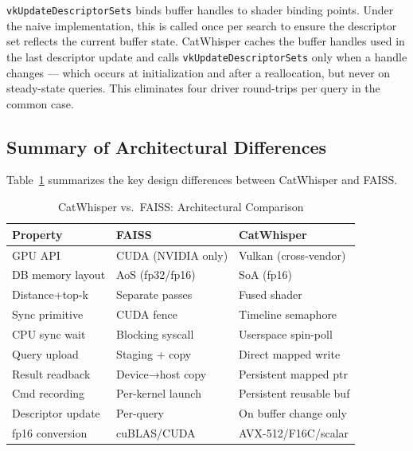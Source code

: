 \documentclass[conference]{IEEEtran}
\begin{document}
\texttt{vkUpdateDescriptorSets} binds buffer handles to shader binding
points.  Under the naive implementation, this is called once per search to
ensure the descriptor set reflects the current buffer state.  CatWhisper
caches the buffer handles used in the last descriptor update and calls
\texttt{vkUpdateDescriptorSets} only when a handle changes --- which occurs
at initialization and after a reallocation, but never on steady-state queries.
This eliminates four driver round-trips per query in the common case.

\subsection{Summary of Architectural Differences}

Table~\ref{tab:arch} summarizes the key design differences between
CatWhisper and FAISS.

\begin{table}[htbp]
  \caption{CatWhisper vs.\ FAISS: Architectural Comparison}
  \label{tab:arch}
  \centering
  \renewcommand{\arraystretch}{1.15}
  \begin{tabular}{lll}
    \toprule
    \textbf{Property} & \textbf{FAISS} & \textbf{CatWhisper} \\
    \midrule
    GPU API           & CUDA (NVIDIA only) & Vulkan (cross-vendor) \\
    DB memory layout  & AoS (fp32/fp16)    & SoA (fp16) \\
    Distance+top-k    & Separate passes    & Fused shader \\
    Sync primitive    & CUDA fence         & Timeline semaphore \\
    CPU sync wait     & Blocking syscall   & Userspace spin-poll \\
    Query upload      & Staging + copy     & Direct mapped write \\
    Result readback   & Device→host copy   & Persistent mapped ptr \\
    Cmd recording     & Per-kernel launch  & Persistent reusable buf \\
    Descriptor update & Per-query          & On buffer change only \\
    fp16 conversion   & cuBLAS/CUDA        & AVX-512/F16C/scalar \\
    \bottomrule
  \end{tabular}
\end{table}

\end{document}
